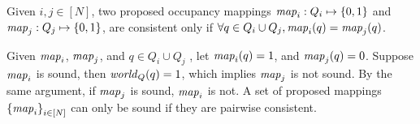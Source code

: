 \begin{definition}
    Given  $i , j \in [N]$, two proposed occupancy mappings $\mathit{map}_i: Q_i\mapsto\left\{0,1\right\}$ and $\mathit{map}_j: Q_j\mapsto \left\{0,1\right\}$, are consistent only if $\forall q \in Q_i \cup Q_j, \mathit{map}_i(q) = \mathit{map}_j(q)$.
\end{definition}

    Given $\mathit{map}_i$, $\mathit{map}_j$, and $q\in Q_i \cup Q_j$ , let $\mathit{map}_i(q) = 1$, and $\mathit{map}_j(q) = 0$. Suppose $\mathit{map}_i$ is sound, then $\mathit{world}_Q(q) = 1$, which implies $\mathit{map}_j$ is not sound. By the same argument, if $\mathit{map}_j$ is sound, $\mathit{map}_i$ is not. A set of proposed mappings $\left\{\mathit{map}_i\right\}_{i\in [N]}$ can only be sound if they are pairwise consistent.


